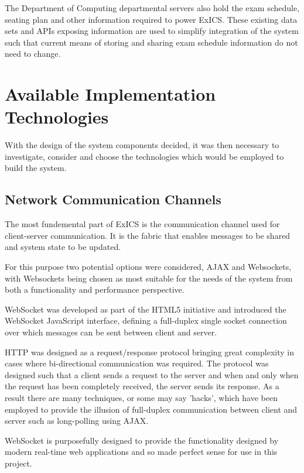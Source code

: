 The Department of Computing departmental servers also hold the exam schedule, seating plan and other information required to power ExICS.  These existing data sets and APIs exposing information are used to simplify integration of the system such that current means of storing and sharing exam schedule information do not need to change.

\FloatBarrier

\section{Available Implementation Technologies}

With the design of the system components decided, it was then necessary to investigate, consider and choose the technologies which would be employed to build the system.

\subsection{Network Communication Channels}

The most fundemental part of ExICS is the communication channel used for client-server communication.  It is the fabric that enables messages to be shared and system state to be updated.

For this purpose two potential options were considered, AJAX and Websockets, with Websockets being chosen as most suitable for the needs of the system from both a functionality and performance perspective.

WebSocket was developed as part of the HTML5 initiative and introduced the WebSocket JavaScript interface, defining a full-duplex single socket connection over which messages can be sent between client and server.

HTTP was designed as a request/response protocol bringing great complexity in cases where bi-directional communication was required.  The protocol was designed such that a client sends a request to the server and when and only when the request has been completely received, the server sends its response. As a result there are many techniques, or some may say 'hacks'\cite{httpabuse}, which have been employed to provide the illusion of full-duplex communication between client and server such as long-polling using AJAX\cite{lpAjax}.

WebSocket is purposefully designed to provide the functionality designed by modern real-time web applications and so made perfect sense for use in this project.
% 

